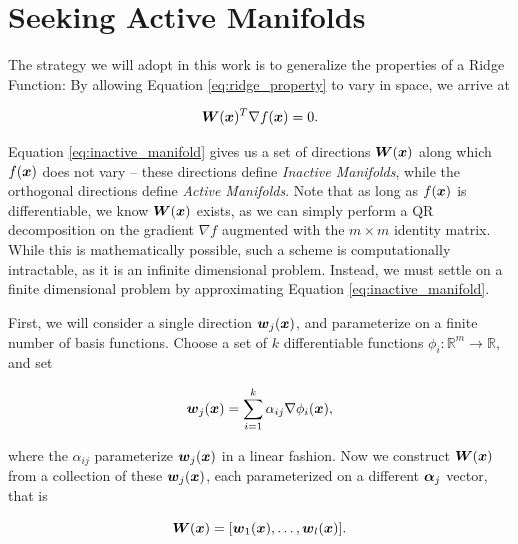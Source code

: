 \documentclass[]{aiaa-tc}%
\begin{document}
\section{Seeking Active Manifolds} \label{sec:active_manifolds}
The strategy we will adopt in this work is to generalize the properties of a Ridge Function: By allowing Equation \ref{eq:ridge_property} to vary in space, we arrive at

\begin{equation}
  \label{eq:inactive_manifold}
  \boldsymbol{W}(\boldsymbol{x})^T \nabla f(\boldsymbol{x}) = 0.
\end{equation}%
%
%
%
%

Equation \ref{eq:inactive_manifold} gives us a set of directions $\boldsymbol{W}(\boldsymbol{x})$ along which $f(\boldsymbol{x})$ does not vary -- these directions define \emph{Inactive Manifolds}, while the orthogonal directions define \emph{Active Manifolds}. Note that as long as $f(\boldsymbol{x})$ is differentiable, we know $\boldsymbol{W}(\boldsymbol{x})$ exists, as we can simply perform a QR decomposition on the gradient $\nabla f$ augmented with the $m\times m$ identity matrix. While this is mathematically possible, such a scheme is computationally intractable, as it is an infinite dimensional problem. Instead, we must settle on a finite dimensional problem by approximating Equation \ref{eq:inactive_manifold}.

First, we will consider a single direction $\boldsymbol{w}_j(\boldsymbol{x})$, and parameterize on a finite number of basis functions. Choose a set of $k$ differentiable functions $\phi_i:\mathbb{R}^m\to\mathbb{R}$, and set

\begin{equation}
\label{eq:parameterized_w}
\boldsymbol{w}_j(\boldsymbol{x}) = \sum_{i=1}^k \alpha_{ij}\nabla\phi_i(\boldsymbol{x}),
\end{equation}
%
%
%
%

where the $\alpha_{ij}$ parameterize $\boldsymbol{w}_j(\boldsymbol{x})$ in a linear fashion. Now we construct $\boldsymbol{W}(\boldsymbol{x})$ from a collection of these $\boldsymbol{w}_j(\boldsymbol{x})$, each parameterized on a different $\boldsymbol{\alpha}_j$ vector, that is

\begin{equation}
\boldsymbol{W}(\boldsymbol{x}) = [\boldsymbol{w}_1(\boldsymbol{x}),\dots,\boldsymbol{w}_l(\boldsymbol{x})].
\end{equation}
\end{document}
